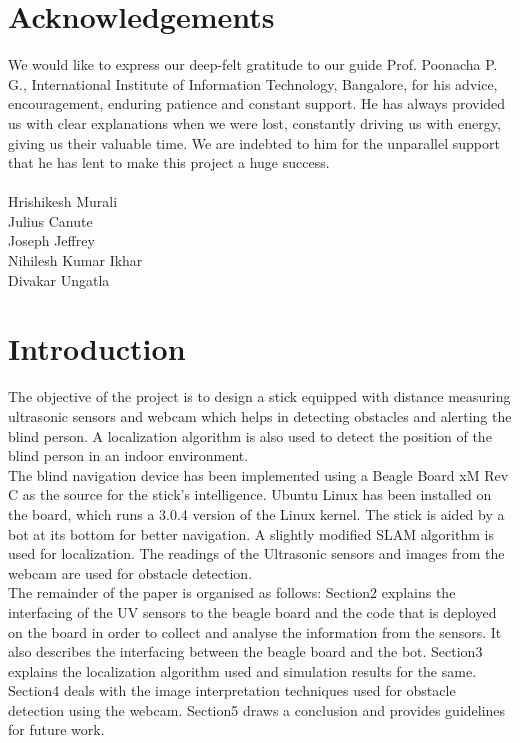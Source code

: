 \documentclass[12pt]{article}
\begin{document}
\newpage
\section*{Acknowledgements}
We would like to express our deep-felt gratitude to our guide Prof. Poonacha P. G., International Institute of Information Technology, Bangalore, for his advice, encouragement, enduring patience and constant support. He has always provided us with clear explanations when we were lost, constantly driving us with energy, giving us their valuable time. We are indebted to him for the unparallel support that he has lent to make this project a huge success.\\\\
Hrishikesh Murali\\
Julius Canute\\
Joseph Jeffrey\\
Nihilesh Kumar Ikhar \\
Divakar Ungatla\\

\newpage
\tableofcontents

\newpage
\section{Introduction}
		
     The objective of the project is to design a stick equipped with distance measuring ultrasonic sensors and webcam which helps in detecting obstacles and alerting the blind person. A localization algorithm is also used to detect the position of the blind person in an indoor environment.\\

The blind navigation device has been implemented using a Beagle Board xM Rev C as the source for the stick's intelligence. Ubuntu Linux has been installed on the board, which runs a 3.0.4 version of the Linux kernel. The stick is aided by a bot at its bottom for better navigation.
A slightly modified SLAM algorithm is used for localization. The readings of the Ultrasonic sensors and images from the webcam are used for obstacle detection.\\

The remainder of the paper is organised as follows: Section2 explains the interfacing of the UV sensors to the beagle board and the code that is deployed on the board in order to collect and analyse the information from the sensors. It also describes the interfacing between the beagle board and the bot. Section3 explains the localization algorithm used and simulation results for the same. Section4 deals with the image interpretation techniques used for obstacle detection using the webcam. Section5 draws a conclusion and provides guidelines for future work.\\
\end{document}
